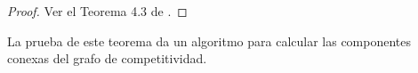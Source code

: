 \begin{proof}
Ver el Teorema 4.3 de \cite{journals/corr/CriadoGPR13a}.
\end{proof}

La prueba de este teorema da un algoritmo para calcular las componentes conexas del grafo de competitividad. 

 
 


